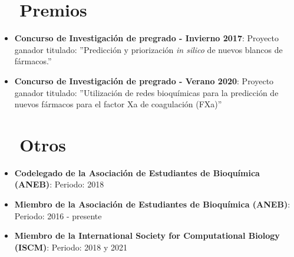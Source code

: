 \documentclass[letter,20pt]{article}
\newcommand{\resumeItem}[2]{
  \item\small{
    \textbf{#1}{: #2 \vspace{-2pt}}
  }
}
\newcommand{\resumeSubItem}[2]{\resumeItem{#1}{#2}\vspace{-3pt}}
\newcommand{\resumeSubHeadingListStart}{\begin{itemize}[leftmargin=*]}
\newcommand{\resumeSubHeadingListEnd}{\end{itemize}}
\begin{document}
\section{~~Premios}
\resumeSubHeadingListStart
\resumeSubItem{Concurso de Investigación de pregrado - Invierno 2017}{Proyecto ganador titulado: ''Predicción y priorización \textit{in silico} de nuevos blancos de fármacos.''}
\vspace{2pt}
\resumeSubItem{Concurso de Investigación de pregrado - Verano 2020}{Proyecto ganador titulado: ''Utilización de redes bioquímicas para la predicción de nuevos fármacos para el factor Xa de coagulación (FXa)''}
\vspace{2pt}
\resumeSubHeadingListEnd
\section{~~Otros}
\resumeSubHeadingListStart
\resumeSubItem{Codelegado de la Asociación de Estudiantes de Bioquímica (ANEB)}{Periodo: 2018}
\vspace{2pt}
\resumeSubItem{Miembro de la Asociación de Estudiantes de Bioquímica (ANEB)}{Periodo: 2016 - presente}
\vspace{2pt}
\resumeSubItem{Miembro de la International Society for Computational Biology (ISCM)}{Periodo: 2018 y 2021}
\vspace{2pt}
\resumeSubHeadingListEnd
\end{document}
